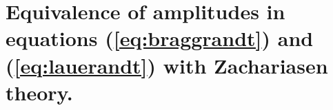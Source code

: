 \documentclass[preprint]{iucr}              %
\begin{document}

\section{Equivalence of amplitudes in equations (\ref{eq:braggrandt}) and (\ref{eq:lauerandt}) with Zachariasen theory.}
\label{appendix:zachariasen}
\end{document}
